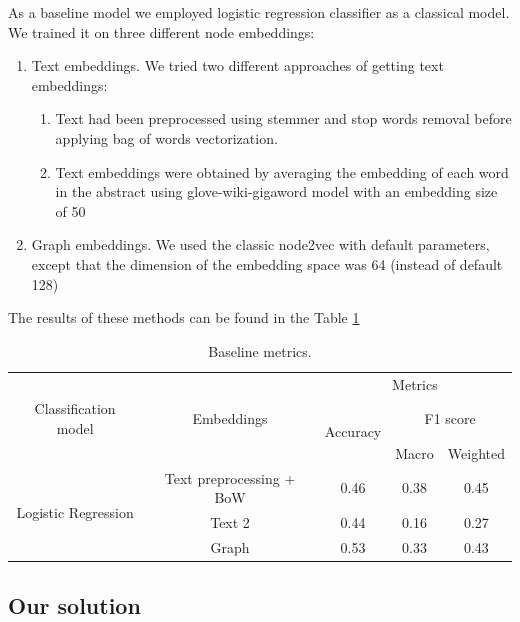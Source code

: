 \documentclass{article}
\begin{document}
As a baseline model we employed logistic regression classifier as a classical model. We trained it on three different node embeddings:
\begin{enumerate}

\item[1.] Text embeddings. \newline
We tried two different approaches of getting text embeddings:
\begin{enumerate}
\item[a)] Text had been preprocessed using stemmer and stop words removal before applying bag of words vectorization.
\item[b)] Text embeddings were obtained by averaging the embedding of each word in the abstract using glove-wiki-gigaword model with an embedding size of 50
\end{enumerate}

\item[2.] Graph embeddings.\newline
We used the classic node2vec with default parameters, except that the dimension of the embedding space was 64 (instead of default 128)
\end{enumerate}

The results of these methods can be found in the Table \ref{table:baseline_metrics}

\begin{table}[h]
\centering
\begin{tabular}{c c  c c c}
\hline\hline
 & & \multicolumn{3}{c}{Metrics} \\
\cline{3-5}
Classification model & Embeddings & \multirow{2}{*}{Accuracy} & \multicolumn{2}{c}{F1 score} \\
 & & & Macro & Weighted \\
\hline
\multirow{3}{*}{Logistic Regression} & Text preprocessing + BoW & 0.46 & 0.38 & 0.45 \\
 & Text 2 & 0.44 & 0.16 & 0.27 \\
 & Graph & 0.53 & 0.33 & 0.43 \\
\hline
\end{tabular}
\caption{Baseline metrics.}
\label{table:baseline_metrics}
\end{table}

\subsection{Our solution}
\end{document}
